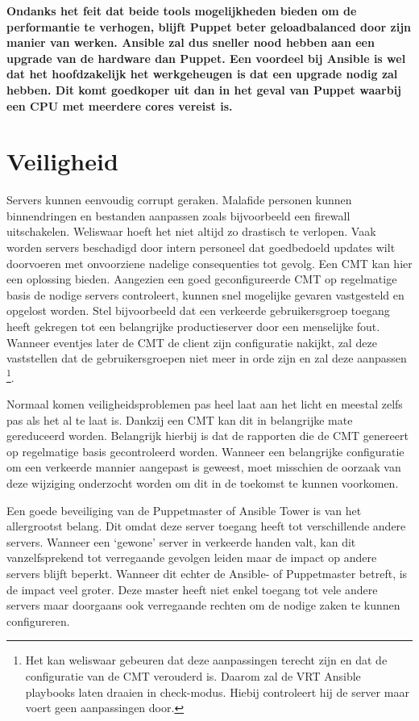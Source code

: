 \textbf{Ondanks het feit dat beide tools mogelijkheden bieden om de performantie te verhogen, blijft Puppet beter geloadbalanced door zijn manier van werken. Ansible zal dus sneller nood hebben aan een upgrade van de hardware dan Puppet. Een voordeel bij Ansible is wel dat het hoofdzakelijk het werkgeheugen is dat een upgrade nodig zal hebben. Dit komt goedkoper uit dan in het geval van Puppet waarbij een CPU met meerdere cores vereist is. }
 

 
 
 \section{Veiligheid}
 \label{sec:veiligheid}
Servers kunnen eenvoudig corrupt geraken. Malafide personen kunnen binnendringen en bestanden aanpassen zoals bijvoorbeeld een firewall uitschakelen. Weliswaar hoeft het niet altijd zo drastisch te verlopen. Vaak worden servers beschadigd door intern personeel dat goedbedoeld updates wilt doorvoeren met onvoorziene nadelige consequenties tot gevolg.
Een \gls{CMT} kan hier een oplossing bieden.  Aangezien een goed geconfigureerde \gls{CMT} op regelmatige basis de nodige servers controleert, kunnen snel mogelijke gevaren vastgesteld en opgelost worden. Stel bijvoorbeeld dat een verkeerde gebruikersgroep toegang heeft gekregen tot een belangrijke productieserver door een menselijke fout. Wanneer eventjes later de \gls{CMT} de client zijn configuratie nakijkt, zal deze vaststellen dat de gebruikersgroepen niet meer in orde zijn en zal deze aanpassen \footnote{Het kan weliswaar gebeuren dat deze aanpassingen terecht zijn en dat de configuratie van de \gls{CMT} verouderd is. Daarom zal de VRT Ansible playbooks laten draaien in check-modus. Hiebij controleert hij de server maar voert geen aanpassingen door.}. 

Normaal komen veiligheidsproblemen pas heel laat aan het licht en meestal zelfs pas als het al te laat is. Dankzij een \gls{CMT} kan dit in belangrijke mate gereduceerd worden. Belangrijk hierbij is dat de rapporten die de \gls{CMT} genereert op regelmatige basis gecontroleerd worden.  Wanneer een belangrijke configuratie om een verkeerde mannier aangepast is geweest, moet misschien de oorzaak van deze wijziging onderzocht worden om dit in de toekomst te kunnen voorkomen.

Een goede beveiliging van de Puppetmaster of Ansible Tower is van het allergrootst belang. Dit omdat deze server toegang heeft tot verschillende andere servers. Wanneer een ‘gewone' server in verkeerde handen valt, kan dit vanzelfsprekend tot verregaande gevolgen leiden maar de impact op andere servers blijft beperkt. Wanneer dit echter de Ansible- of Puppetmaster betreft, is de impact veel groter. Deze master heeft niet enkel toegang tot vele andere servers maar doorgaans ook verregaande rechten om de nodige zaken te kunnen configureren.

